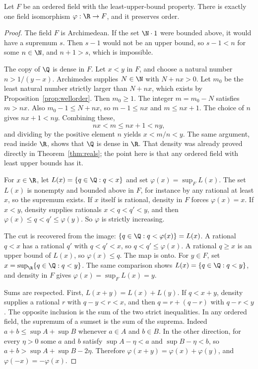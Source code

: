 \begin{theorem}[uniqueness of $\R$]\label{thm:uniqueR}
Let $F$ be an ordered field with the least-upper-bound property. There is exactly one field isomorphism $\varphi:\R\to F$, and it preserves order.
\end{theorem}
\begin{proof}
The field $F$ is Archimedean. If the set $\N\cdot 1$ were bounded above, it would have a supremum $s$. Then $s-1$ would not be an upper bound, so $s-1<n$ for some $n\in\N$, and $n+1>s$, which is impossible.

The copy of $\Q$ is dense in $F$. Let $x<y$ in $F$, and choose a natural number $n>1/(y-x)$. Archimedes supplies $N\in\N$ with $N+nx>0$. Let $m_0$ be the least natural number strictly larger than $N+nx$, which exists by Proposition~\ref{prop:wellorder}. Then $m_0\ge 1$. The integer $m=m_0-N$ satisfies $m>nx$. Also $m_0-1\le N+nx$, so $m-1\le nx$ and $m\le nx+1$. The choice of $n$ gives $nx+1<ny$. Combining these,
\[
nx<m\le nx+1<ny,
\]
and dividing by the positive element $n$ yields $x<m/n<y$. The same argument, read inside $\R$, shows that $\Q$ is dense in $\R$. That density was already proved directly in Theorem~\ref{thm:reals}; the point here is that any ordered field with least upper bounds has it.

For $x\in\R$, let $L(x)=\{q\in\Q:q<x\}$ and set $\varphi(x)=\sup_F L(x)$. The set $L(x)$ is nonempty and bounded above in $F$, for instance by any rational at least $x$, so the supremum exists. If $x$ itself is rational, density in $F$ forces $\varphi(x)=x$. If $x<y$, density supplies rationals $x<q<q'<y$, and then $\varphi(x)\le q<q'\le\varphi(y)$. So $\varphi$ is strictly increasing.

The cut is recovered from the image: $\{q\in\Q:q<\varphi(x)\}=L(x)$. A rational $q<x$ has a rational $q'$ with $q<q'<x$, so $q<q'\le\varphi(x)$. A rational $q\ge x$ is an upper bound of $L(x)$, so $\varphi(x)\le q$. The map is onto. For $y\in F$, set $x=\sup_\R\{q\in\Q:q<y\}$. The same comparison shows $L(x)=\{q\in\Q:q<y\}$, and density in $F$ gives $\varphi(x)=\sup_F L(x)=y$.

Sums are respected. First, $L(x+y)=L(x)+L(y)$. If $q<x+y$, density supplies a rational $r$ with $q-y<r<x$, and then $q=r+(q-r)$ with $q-r<y$. The opposite inclusion is the sum of the two strict inequalities. In any ordered field, the supremum of a sumset is the sum of the suprema. Indeed $a+b\le\sup A+\sup B$ whenever $a\in A$ and $b\in B$. In the other direction, for every $\eta>0$ some $a$ and $b$ satisfy $\sup A-\eta<a$ and $\sup B-\eta<b$, so $a+b>\sup A+\sup B-2\eta$. Therefore $\varphi(x+y)=\varphi(x)+\varphi(y)$, and $\varphi(-x)=-\varphi(x)$.


\end{proof}
